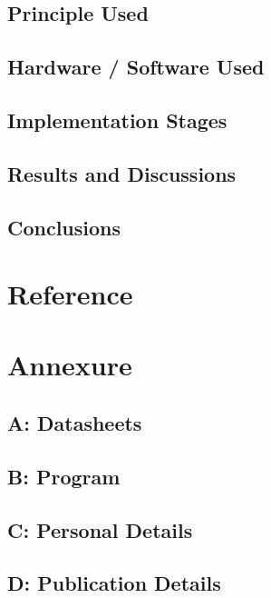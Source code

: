 \documentclass{book}
\begin{document}
\section{Principle Used}
\paragraph{}

\section{Hardware / Software Used}
\paragraph{}

\section{Implementation Stages}
\paragraph{}

\begin{doublespace} 
	\chapter{Results and Discussions}
\end{doublespace}



\begin{doublespace} 
	\chapter{Conclusions}
\end{doublespace}




\chapter{Reference}
\thispagestyle{empty}

\chapter{Annexure}
\setcounter{page}{1}
\section {A: Datasheets}
\section {B: Program}
\section {C: Personal Details}
\section {D: Publication Details}
\end{document}
